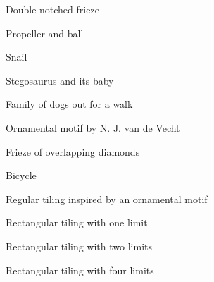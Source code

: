 \begin{figure}[htbp]
 \caption{Double notched frieze}
 \label{fig:dfrisec}
\end{figure}
\begin{figure}[htbp]
 \caption{Propeller and ball}
 \label{fig:heba}
\end{figure}
\begin{figure}[htbp]
 \caption{Snail}
 \label{fig:escar}
\end{figure}
\begin{figure}[htbp]
 \caption{Stegosaurus and its baby}
 \label{fig:steg2}
\end{figure}
\begin{figure}[htbp]
 \caption{Family of dogs out for a walk}
 \label{fig:chiens}
\end{figure}
\begin{figure}[htbp]
 \caption{Ornamental motif by N. J. van de Vecht}
 \label{fig:mVdV}
\end{figure}
\begin{figure}[htbp]
 \caption{Frieze of overlapping diamonds}
 \label{fig:frlos}
\end{figure}
\begin{figure}[htbp]
 \caption{Bicycle}
 \label{fig:velo}
\end{figure}
\begin{figure}[htbp]
 \caption{Regular tiling inspired by an ornamental motif\label{fig:PVdV}}
\end{figure}
\begin{figure}[htbp]
 \caption{Rectangular tiling with one limit}
 \label{fig:PVdV1l}
\end{figure}
\begin{figure}[htbp]
 \caption{Rectangular tiling with two limits}
 \label{fig:PVdV2l}
\end{figure}
\begin{figure}[htbp]
 \caption{Rectangular tiling with four limits}
 \label{fig:PVdV4l}
\end{figure}

